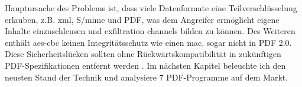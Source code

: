 Hauptursache des Problems ist, dass viele Datenformate eine Teilverschlüsselung erlauben, z.B. \gls{xml}, S/\gls{mime} und PDF, was dem Angreifer ermöglicht eigene Inhalte einzuschleusen und exfiltration channels bilden zu können. Des Weiteren enthält \gls{aes}-\gls{cbc} keinen Integritätsschutz wie einen \gls{mac}, sogar nicht in PDF 2.0. Diese Sicherheitslücken sollten ohne Rückwärtskompatibilität in zukünftigen PDF-Spezifikationen entfernt werden \cite{pdfex}. Im nächsten Kapitel beleuchte ich den neusten Stand der Technik und analysiere 7 PDF-Programme auf dem Markt.